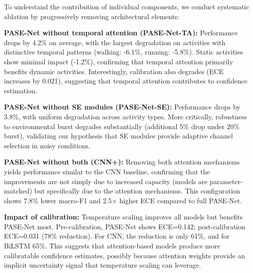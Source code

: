 \documentclass[journal]{IEEEtran}
\begin{document}
To understand the contribution of individual components, we conduct systematic ablation by progressively removing architectural elements:

\textbf{PASE-Net without temporal attention (PASE-Net-TA):} Performance drops by 4.2\% on average, with the largest degradation on activities with distinctive temporal patterns (walking: -6.1\%, running: -5.8\%). Static activities show minimal impact (-1.2\%), confirming that temporal attention primarily benefits dynamic activities. Interestingly, calibration also degrades (ECE increases by 0.021), suggesting that temporal attention contributes to confidence estimation.

\textbf{PASE-Net without SE modules (PASE-Net-SE):} Performance drops by 3.8\%, with uniform degradation across activity types. More critically, robustness to environmental burst degrades substantially (additional 5\% drop under 20\% burst), validating our hypothesis that SE modules provide adaptive channel selection in noisy conditions.

\textbf{PASE-Net without both (CNN+):} Removing both attention mechanisms yields performance similar to the CNN baseline, confirming that the improvements are not simply due to increased capacity (models are parameter-matched) but specifically due to the attention mechanisms. This configuration shows 7.8\% lower macro-F1 and 2.5× higher ECE compared to full PASE-Net.

\textbf{Impact of calibration:} Temperature scaling improves all models but benefits PASE-Net most. Pre-calibration, PASE-Net shows ECE=0.142; post-calibration ECE=0.031 (78\% reduction). For CNN, the reduction is only 61\%, and for BiLSTM 65\%. This suggests that attention-based models produce more calibratable confidence estimates, possibly because attention weights provide an implicit uncertainty signal that temperature scaling can leverage.

\end{document}
